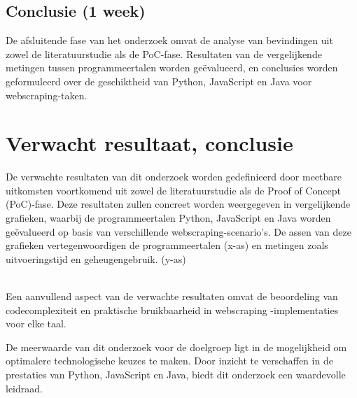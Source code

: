 \subsection{Conclusie (1 week)}
De afsluitende fase van het onderzoek omvat de analyse van bevindingen uit zowel de literatuurstudie als de PoC-fase. 
Resultaten van de vergelijkende metingen tussen programmeertalen worden geëvalueerd, en conclusies worden geformuleerd over de 
geschiktheid van Python, JavaScript en Java voor webscraping-taken.
\section{Verwacht resultaat, conclusie}%
\label{sec:verwachte_resultaten}
De verwachte resultaten van dit onderzoek worden gedefinieerd door meetbare uitkomsten voortkomend uit zowel de literatuurstudie 
als de Proof of Concept (PoC)-fase. Deze resultaten zullen concreet worden weergegeven in vergelijkende grafieken, waarbij de 
programmeertalen Python, JavaScript en Java worden geëvalueerd op basis van verschillende webscraping-scenario's. 
De assen van deze grafieken vertegenwoordigen de programmeertalen (x-as) en metingen zoals uitvoeringstijd en geheugengebruik. (y-as)
\\
\\
  
Een aanvullend aspect van de verwachte resultaten omvat de beoordeling van codecomplexiteit en praktische bruikbaarheid in webscraping
-implementaties voor elke taal.

De meerwaarde van dit onderzoek voor de doelgroep ligt in de mogelijkheid om optimalere technologische keuzes te maken. 
Door inzicht te verschaffen in de prestaties van Python, JavaScript en Java, biedt dit onderzoek een waardevolle leidraad. 